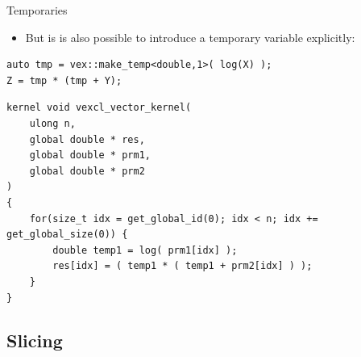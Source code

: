 \documentclass[@BEAMER_OPTIONS@]{beamer}
\begin{document}
\begin{frame}[fragile]{Temporaries}
    \begin{itemize}
        \item But is is also possible to introduce a temporary variable
            explicitly:
    \end{itemize}
    \begin{exampleblock}{}
        \begin{lstlisting}
auto tmp = vex::make_temp<double,1>( log(X) );
Z = tmp * (tmp + Y);
        \end{lstlisting}
    \end{exampleblock}
    \begin{exampleblock}{}
        \begin{lstlisting}
kernel void vexcl_vector_kernel(
    ulong n,
    global double * res,
    global double * prm1,
    global double * prm2
)
{
    for(size_t idx = get_global_id(0); idx < n; idx += get_global_size(0)) {
        double temp1 = log( prm1[idx] );
        res[idx] = ( temp1 * ( temp1 + prm2[idx] ) );
    }
}
        \end{lstlisting}
    \end{exampleblock}
\end{frame}

\subsection{Slicing}
\end{document}
